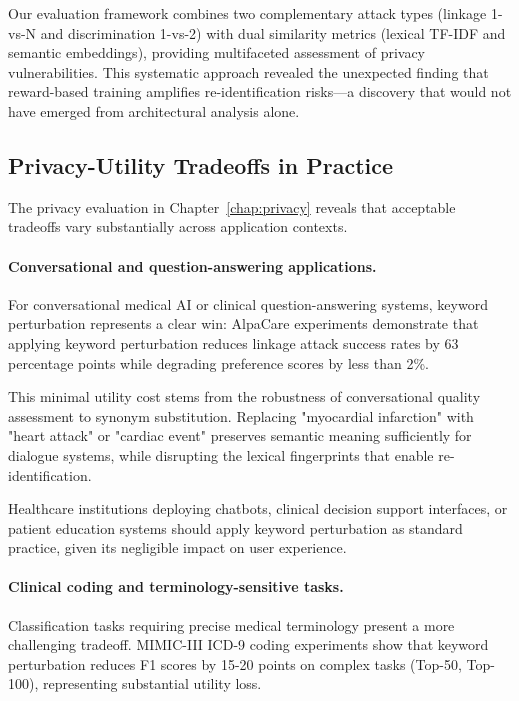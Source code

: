 Our evaluation framework combines two complementary attack types (linkage 1-vs-N and discrimination 1-vs-2) with dual similarity metrics (lexical TF-IDF and semantic embeddings), providing multifaceted assessment of privacy vulnerabilities.
This systematic approach revealed the unexpected finding that reward-based training amplifies re-identification risks—a discovery that would not have emerged from architectural analysis alone.


\subsection{Privacy-Utility Tradeoffs in Practice}

The privacy evaluation in Chapter~\ref{chap:privacy} reveals that acceptable tradeoffs vary substantially across application contexts.

\paragraph{Conversational and question-answering applications.}

For conversational medical AI or clinical question-answering systems, keyword perturbation represents a clear win: AlpaCare experiments demonstrate that applying keyword perturbation reduces linkage attack success rates by 63 percentage points while degrading preference scores by less than 2\%.

This minimal utility cost stems from the robustness of conversational quality assessment to synonym substitution.
Replacing "myocardial infarction" with "heart attack" or "cardiac event" preserves semantic meaning sufficiently for dialogue systems, while disrupting the lexical fingerprints that enable re-identification.

Healthcare institutions deploying chatbots, clinical decision support interfaces, or patient education systems should apply keyword perturbation as standard practice, given its negligible impact on user experience.

\paragraph{Clinical coding and terminology-sensitive tasks.}

Classification tasks requiring precise medical terminology present a more challenging tradeoff.
MIMIC-III ICD-9 coding experiments show that keyword perturbation reduces F1 scores by 15-20 points on complex tasks (Top-50, Top-100), representing substantial utility loss.

